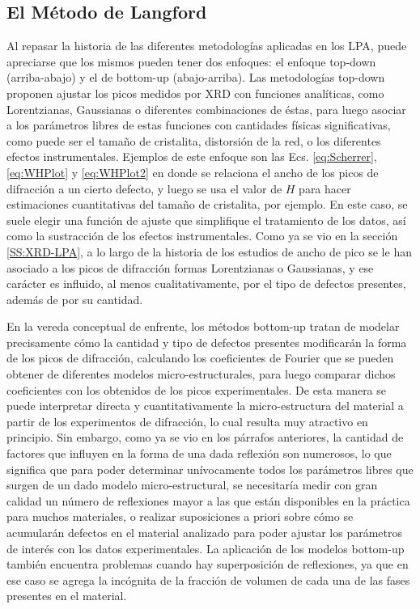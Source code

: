 \subsection{El Método de Langford}\label{SS:Langford}
Al repasar la historia de las diferentes metodologías aplicadas en los LPA, puede apreciarse que los mismos pueden tener dos enfoques: el enfoque top-down (arriba-abajo) y el de bottom-up (abajo-arriba).
Las metodologías top-down proponen ajustar los picos medidos por XRD con funciones analíticas, como Lorentzianas, Gaussianas o diferentes combinaciones de éstas, para luego asociar a los parámetros libres de estas funciones con cantidades físicas significativas, como puede ser el tamaño de cristalita, distorsión de la red, o los diferentes efectos instrumentales.
Ejemplos de este enfoque son las Ecs. \ref{eq:Scherrer}, \ref{eq:WHPlot} y \ref{eq:WHPlot2} en donde se relaciona el ancho de los picos de difracción a un cierto defecto, y luego se usa el valor de $H$ para hacer estimaciones cuantitativas del tamaño de cristalita, por ejemplo.
En este caso, se suele elegir una función de ajuste que simplifique el tratamiento de los datos, así como la sustracción de los efectos instrumentales.
Como ya se vio en la sección \ref{SS:XRD-LPA}, a lo largo de la historia de los estudios de ancho de pico se le han asociado a los picos de difracción formas Lorentzianas o Gaussianas, y ese carácter es influido, al menos cualitativamente, por el tipo de defectos presentes, además de por su cantidad.

En la vereda conceptual de enfrente, los métodos bottom-up tratan de modelar precisamente cómo la cantidad y tipo de defectos presentes modificarán la forma de los picos de difracción, calculando los coeficientes de Fourier que se pueden obtener de diferentes modelos micro-estructurales, para luego comparar dichos coeficientes con los obtenidos de los picos experimentales.
De esta manera se puede interpretar directa y cuantitativamente la micro-estructura del material a partir de los experimentos de difracción, lo cual resulta muy atractivo en principio.
Sin embargo, como ya se vio en los párrafos anteriores, la cantidad de factores que influyen en la forma de una dada reflexión son numerosos, lo que significa que para poder determinar unívocamente todos los parámetros libres que surgen de un dado modelo micro-estructural, se necesitaría medir con gran calidad un número de reflexiones mayor a las que están disponibles en la práctica para muchos materiales, o realizar suposiciones a priori sobre cómo se acumularán defectos en el material analizado para poder ajustar los parámetros de interés con los datos experimentales.
La aplicación de los modelos bottom-up también encuentra problemas cuando hay superposición de reflexiones, ya que en ese caso se agrega la incógnita de la fracción de volumen de cada una de las fases presentes en el material.


